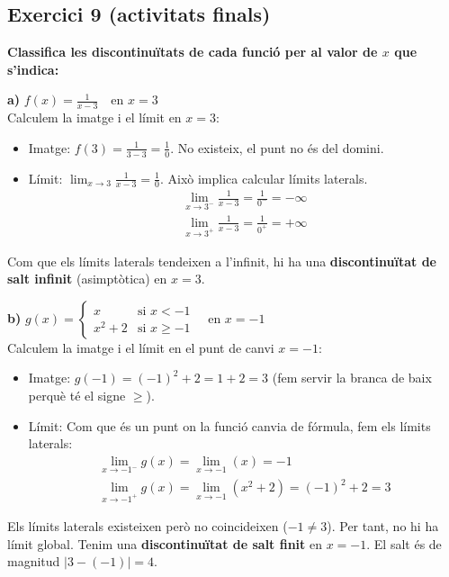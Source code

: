 \documentclass[12pt,a4paper]{article}
\begin{document}
\vspace{0.5cm}

\subsection{Exercici 9 (activitats finals)}

\textbf{Classifica les discontinuïtats de cada funció per al valor de $x$ que s'indica:}

\textbf{a)} $f(x) = \frac{1}{x-3} \quad \text{en } x=3$ \\
Calculem la imatge i el límit en $x=3$:
\begin{itemize}
    \item Imatge: $f(3) = \frac{1}{3-3} = \frac{1}{0}$. No existeix, el punt no és del domini.
    \item Límit: $\lim_{x \to 3} \frac{1}{x-3} = \frac{1}{0}$. Això implica calcular límits laterals.
    \begin{align*}
        \lim_{x \to 3^-} \frac{1}{x-3} = \frac{1}{0^-} = -\infty \\
        \lim_{x \to 3^+} \frac{1}{x-3} = \frac{1}{0^+} = +\infty
    \end{align*}
\end{itemize}
Com que els límits laterals tendeixen a l'infinit, hi ha una \textbf{discontinuïtat de salt infinit} (asimptòtica) en $x=3$.

\vspace{0.3cm}
\textbf{b)} $g(x) = \begin{cases} x & \text{si } x < -1 \\ x^2+2 & \text{si } x \ge -1 \end{cases} \quad \text{en } x=-1$ \\
Calculem la imatge i el límit en el punt de canvi $x=-1$:
\begin{itemize}
    \item Imatge: $g(-1) = (-1)^2+2 = 1+2 = 3$ (fem servir la branca de baix perquè té el signe $\ge$).
    \item Límit: Com que és un punt on la funció canvia de fórmula, fem els límits laterals:
    \begin{align*}
        \lim_{x \to -1^-} g(x) = \lim_{x \to -1} (x) = -1 \\
        \lim_{x \to -1^+} g(x) = \lim_{x \to -1} (x^2+2) = (-1)^2+2 = 3
    \end{align*}
\end{itemize}
Els límits laterals existeixen però no coincideixen ($-1 \neq 3$). Per tant, no hi ha límit global. Tenim una \textbf{discontinuïtat de salt finit} en $x=-1$. El salt és de magnitud $|3 - (-1)| = 4$.
\end{document}
